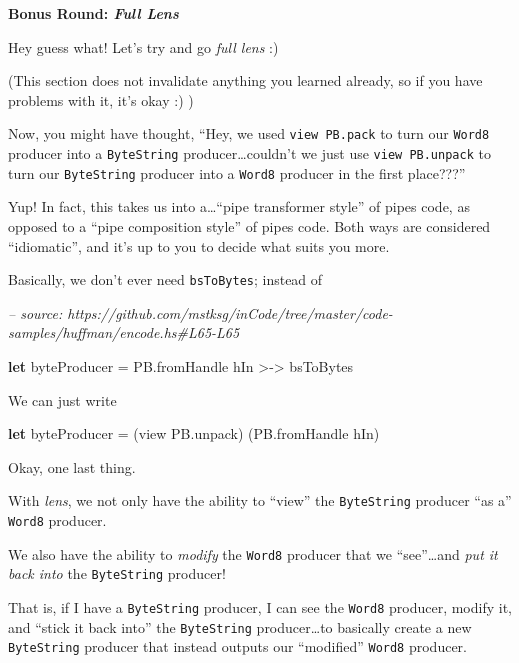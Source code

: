 \documentclass[]{article}
\newenvironment{Shaded}{}{}
\newcommand{\CommentTok}[1]{\textcolor[rgb]{0.38,0.63,0.69}{\textit{#1}}}
\newcommand{\FunctionTok}[1]{\textcolor[rgb]{0.02,0.16,0.49}{#1}}
\newcommand{\KeywordTok}[1]{\textcolor[rgb]{0.00,0.44,0.13}{\textbf{#1}}}
\newcommand{\NormalTok}[1]{#1}
\begin{document}
\textbf{Bonus Round: \emph{Full Lens}}

Hey guess what! Let's try and go \emph{full lens} :)

(This section does not invalidate anything you learned already, so if you have
problems with it, it's okay :) )

Now, you might have thought, ``Hey, we used \texttt{view\ PB.pack} to turn our
\texttt{Word8} producer into a \texttt{ByteString} producer\ldots{}couldn't we
just use \texttt{view\ PB.unpack} to turn our \texttt{ByteString} producer into
a \texttt{Word8} producer in the first place???''

Yup! In fact, this takes us into a\ldots{}``pipe transformer style'' of pipes
code, as opposed to a ``pipe composition style'' of pipes code. Both ways are
considered ``idiomatic'', and it's up to you to decide what suits you more.

Basically, we don't ever need \texttt{bsToBytes}; instead of

\begin{Shaded}
\begin{Highlighting}[]
\CommentTok{-- source: https://github.com/mstksg/inCode/tree/master/code-samples/huffman/encode.hs#L65-L65}

    \KeywordTok{let}\NormalTok{ byteProducer }\FunctionTok{=}\NormalTok{ PB.fromHandle hIn }\FunctionTok{>->}\NormalTok{ bsToBytes}
\end{Highlighting}
\end{Shaded}

We can just write

\begin{Shaded}
\begin{Highlighting}[]
\KeywordTok{let}\NormalTok{ byteProducer }\FunctionTok{=}\NormalTok{ (view PB.unpack) (PB.fromHandle hIn)}
\end{Highlighting}
\end{Shaded}

Okay, one last thing.

With \emph{lens}, we not only have the ability to ``view'' the
\texttt{ByteString} producer ``as a'' \texttt{Word8} producer.

We also have the ability to \emph{modify} the \texttt{Word8} producer that we
``see''\ldots{}and \emph{put it back into} the \texttt{ByteString} producer!

That is, if I have a \texttt{ByteString} producer, I can see the \texttt{Word8}
producer, modify it, and ``stick it back into'' the \texttt{ByteString}
producer\ldots{}to basically create a new \texttt{ByteString} producer that
instead outputs our ``modified'' \texttt{Word8} producer.
\end{document}
